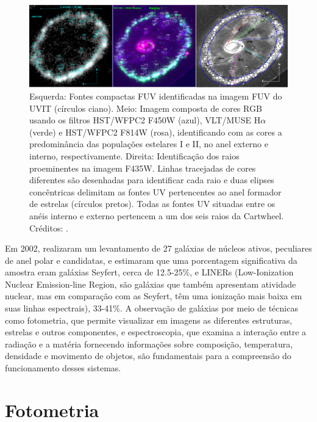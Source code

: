\begin{figure}[h]
  \centering 
  \includegraphics[width=1.0\textwidth]{Imagens/cart.PNG} 
  \caption[Galáxia Cartwheel vista com imagens no ultravioleta distante (FUV) obtidas pela missão AstroSat/UVIT, e RGB por HST/WFPC2 e VLT/MUSE.]{Esquerda: Fontes compactas FUV identificadas na imagem FUV do UVIT (círculos ciano). Meio: Imagem composta de cores RGB usando os filtros HST/WFPC2 F450W (azul), VLT/MUSE H$\alpha$ (verde) e HST/WFPC2 F814W (rosa), identificando com as cores a predominância das populações estelares I e II, no anel externo e interno, respectivamente. Direita: Identificação dos raios proeminentes na imagem F435W. Linhas tracejadas de cores diferentes são desenhadas para identificar cada raio e duas elipses concêntricas delimitam as fontes UV pertencentes ao anel formador de estrelas (círculos pretos). Todas as fontes UV situadas entre os anéis interno e externo pertencem a um dos seis raios da Cartwheel. Créditos: .}
  \label{fig:cart9} 
\end{figure}

Em 2002,  realizaram um levantamento de 27 galáxias de núcleos ativos, peculiares de anel polar e candidatas, e estimaram que uma porcentagem significativa da amostra eram galáxias Seyfert, cerca de 12.5-25\%, e LINERs (Low-Ionization Nuclear Emission-line Region, são galáxias que também apresentam atividade nuclear, mas em comparação com as Seyfert, têm uma ionização mais baixa em suas linhas espectrais), 33-41\%. A observação de galáxias por meio de técnicas como fotometria, que permite visualizar em imagens as diferentes estruturas, estrelas e outros componentes, e espectroscopia, que examina a interação entre a radiação e a matéria fornecendo informações sobre composição, temperatura, densidade e movimento de objetos, são fundamentais para a compreensão do funcionamento desses sistemas.

\section{Fotometria}

